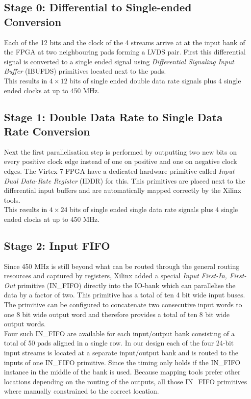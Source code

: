 \subsection{Stage 0: Differential to Single-ended Conversion}
Each of the 12 bits and the clock of the 4 streams arrive at at the input bank
of the \gls{FPGA} at two neighbouring pads forming a \gls{LVDS} pair.
First this differential signal is converted to a single ended signal using
{\em Differential Signaling Input Buffer} (IBUFDS) primitives located next
to the pads. \\

This results in $4 \times 12$ bits of single ended double data rate
signals plus 4 single ended clocks at up to 450 MHz. \\

\subsection{Stage 1: Double Data Rate to Single Data Rate Conversion}
\label{sec:fpga_adc_s1}
Next the first parallelisation step is performed by outputting two new
bits on every positive clock edge instead of one on positive and one on negative
clock edges. The Virtex-7 \gls{FPGA} have a dedicated hardware primitive
called {\em Input Dual Data-Rate Register} (IDDR) for this.
This primitives are placed next to the differential input buffers
and are automatically mapped correctly by the Xilinx tools. \\

This results in $4 \times 24$ bits of single ended single data rate
signals plus 4 single ended clocks at up to 450 MHz. \\

\subsection{Stage 2: Input FIFO}
Since 450 MHz is still beyond what can be routed through the general
routing resources and captured by registers, Xilinx added a special
{\em Input First-In, First-Out} primitive (IN\_FIFO)
directly into the IO-bank which can parallelise the data by a factor of two.
This primitive has a total of ten 4 bit wide input buses.
The primitive can be configured to concatenate two consecutive input words
to one 8 bit wide output word and therefore provides a total of
ten 8 bit wide output words. \\

Four such IN\_FIFO are available for each
input/output bank consisting of a total of 50 pads aligned in a single row.
In our design each of the four 24-bit input streams is located at a separate
input/output bank and is routed to the inputs of one IN\_FIFO primitive.
Since the timing only holds if the IN\_FIFO instance in the middle of the bank
is used. Because mapping tools prefer other locations depending on the
routing of the outputs, all those IN\_FIFO primitives where manually constrained
to the correct location. \\


